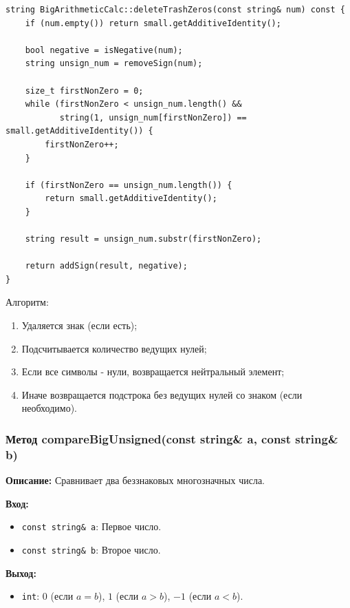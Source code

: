 \begin{lstlisting}[style=cstyle, caption={Реализация deleteTrashZeros()}]
string BigArithmeticCalc::deleteTrashZeros(const string& num) const {
    if (num.empty()) return small.getAdditiveIdentity();
    
    bool negative = isNegative(num);
    string unsign_num = removeSign(num);
    
    size_t firstNonZero = 0;
    while (firstNonZero < unsign_num.length() && 
           string(1, unsign_num[firstNonZero]) == small.getAdditiveIdentity()) {
        firstNonZero++;
    }
    
    if (firstNonZero == unsign_num.length()) {
        return small.getAdditiveIdentity();
    }
    
    string result = unsign_num.substr(firstNonZero);
    
    return addSign(result, negative);
}
\end{lstlisting}

Алгоритм: 
\begin{enumerate}
    \item Удаляется знак (если есть);
    \item Подсчитывается количество ведущих нулей;
    \item Если все символы - нули, возвращается нейтральный элемент;
    \item Иначе возвращается подстрока без ведущих нулей со знаком (если необходимо).
\end{enumerate}

\subsubsection{Метод compareBigUnsigned(const string\& a, const string\& b)}

\textbf{Описание:} Сравнивает два беззнаковых многозначных числа.

\textbf{Вход: }
\begin{itemize}
    \item \texttt{const string\& a}: Первое число.
    \item \texttt{const string\& b}: Второе число.
\end{itemize}

\textbf{Выход:}
\begin{itemize}
    \item \texttt{int}: $0$ (если $a = b$), $1$ (если $a > b$), $-1$ (если $a < b$).
\end{itemize}

